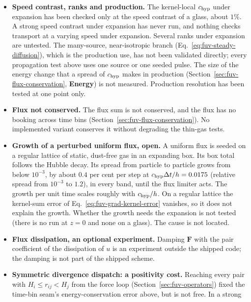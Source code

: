 \begin{itemize}
    the energy books close when gravity sets the steps. It does not show
    that the cosmology or the forces are realistic.
  \item \textbf{Speed contrast, ranks and production.} The kernel-local
    $c_{\rm hyp}$ under expansion has been checked only at the speed
    contrast of a glass, about $1\%$. A strong speed contrast under
    expansion has never run, and nothing checks transport at a varying
    speed under expansion. Several ranks under expansion are untested.
    The many-source, near-isotropic branch
    (Eq.~\ref{eq:fuv-steady-diffusion}), which is the production use, has
    not been validated directly; every propagation test above uses one
    source or one seeded pulse. The size of the energy change that a
    spread of $c_{\rm hyp}$ makes in production
    (Section~\ref{sec:fuv-flux-conservation}, \textbf{Energy}) is not
    measured. Production resolution has been tested at one point only.
  \item \textbf{Flux not conserved.} The flux sum is not conserved, and
    the flux has no booking across time bins
    (Section~\ref{sec:fuv-flux-conservation}). No implemented variant
    conserves it without degrading the thin-gas tests.
  \item \textbf{Growth of a perturbed uniform flux, open.} A uniform flux
    is seeded on a regular lattice of static, dust-free gas in an
    expanding box. Its box total follows the Hubble decay. Its spread
    from particle to particle grows from below $10^{-3}$, by about $0.4$
    per cent per step at $c_{\rm hyp}\Delta t/h = 0.0175$ (relative spread
    from $10^{-3}$ to $1.2$), in every band, until the flux limiter acts.
    The growth per unit time scales roughly with $c_{\rm hyp}/h$. On a
    regular lattice the kernel-sum error of
    Eq.~\ref{eq:fuv-grad-kernel-error} vanishes, so it does not explain
    the growth. Whether the growth needs the expansion is not tested
    (there is no run at $z=0$ and none on a glass). The cause is not
    located.
  \item \textbf{Flux dissipation, an optional experiment.} Damping
    $\mathbf F$ with the pair coefficient of the dissipation of $u$ is
    an experiment outside the shipped code; the damping is not part of
    the shipped scheme.
  \item \textbf{Symmetric divergence dispatch: a positivity cost.}
    Reaching every pair with $H_i \le r_{ij} < H_j$ from the force loop
    (Section~\ref{sec:fuv-operators}) fixed the time-bin seam's
    energy-conservation error above, but is not free. In a strong

\end{itemize}
